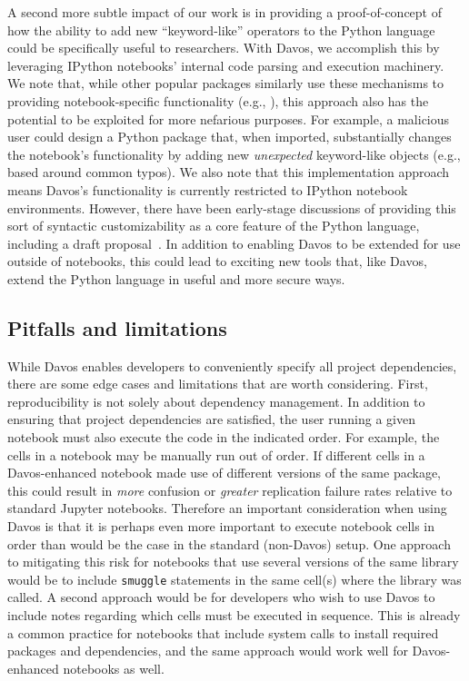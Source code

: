 \documentclass[preprint,12pt,a4paper]{elsarticle}
\begin{document}
A second more subtle impact of our work is in providing a
proof-of-concept of how the ability to add new ``keyword-like''
operators to the Python language could be specifically useful to
researchers. With Davos, we accomplish this by leveraging
IPython notebooks' internal code parsing and execution machinery. We
note that, while other popular packages similarly use these mechanisms
to providing notebook-specific functionality (e.g.,
\cite{Hunt07,HeusEtal18}), this approach also has the potential to be
exploited for more nefarious purposes. For example, a malicious user
could design a Python package that, when imported, substantially
changes the notebook's functionality by adding new \textit{unexpected}
keyword-like objects (e.g., based around common typos). We also note
that this implementation approach means Davos's functionality
is currently restricted to IPython notebook environments. However,
there have been early-stage discussions of providing this sort of
syntactic customizability as a core feature of the Python language,
including a draft proposal~\cite{Shan20}. In addition to enabling
Davos to be extended for use outside of notebooks, this could
lead to exciting new tools that, like Davos, extend the
Python language in useful and more secure ways.

\subsection{Pitfalls and limitations}

While Davos enables developers to conveniently specify all project
dependencies, there are some edge cases and limitations that are worth
considering. First, reproducibility is not solely about dependency management.
In addition to ensuring that project dependencies are satisfied, the user
running a given notebook must also execute the code in the indicated order. For
example, the cells in a notebook may be manually run out of order. If different
cells in a Davos-enhanced notebook made use of different versions of the same
package, this could result in \textit{more} confusion or \textit{greater}
replication failure rates relative to standard Jupyter notebooks. Therefore an
important consideration when using Davos is that it is perhaps even more
important to execute notebook cells in order than would be the case in the
standard (non-Davos) setup. One approach to mitigating this risk for notebooks
that use several versions of the same library would be to include
\texttt{smuggle} statements in the same cell(s) where the library was called. A
second approach would be for developers who wish to use Davos to include notes
regarding which cells must be executed in sequence. This is already a common
practice for notebooks that include system calls to install required packages
and dependencies, and the same approach would work well for Davos-enhanced
notebooks as well.
\end{document}
